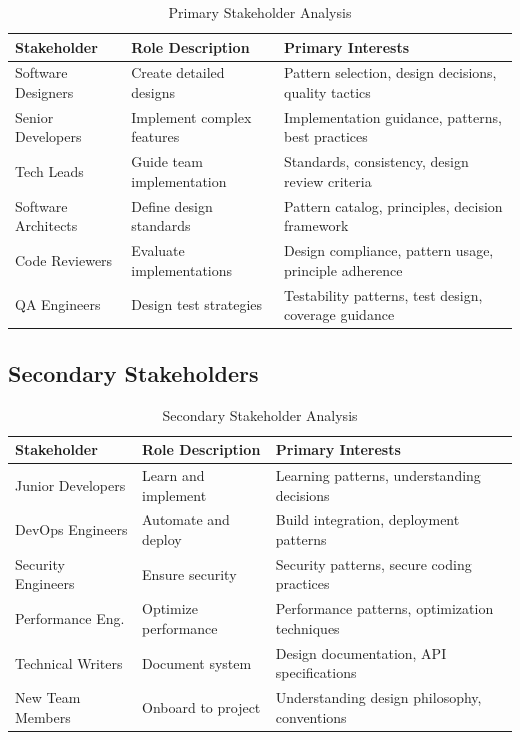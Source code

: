 \documentclass[11pt,letterpaper]{article}
\begin{document}
\begin{table}[H]
\centering
\caption{Primary Stakeholder Analysis}
\small
\begin{tabular}{@{}L{2.6cm}L{3.6cm}L{7cm}@{}}
\toprule
\textbf{Stakeholder} & \textbf{Role Description} & \textbf{Primary Interests} \\
\midrule
Software Designers & Create detailed designs & Pattern selection, design decisions, quality tactics \\
\addlinespace
Senior Developers & Implement complex features & Implementation guidance, patterns, best practices \\
\addlinespace
Tech Leads & Guide team implementation & Standards, consistency, design review criteria \\
\addlinespace
Software Architects & Define design standards & Pattern catalog, principles, decision framework \\
\addlinespace
Code Reviewers & Evaluate implementations & Design compliance, pattern usage, principle adherence \\
\addlinespace
QA Engineers & Design test strategies & Testability patterns, test design, coverage guidance \\
\bottomrule
\end{tabular}
\end{table}

\subsection{Secondary Stakeholders}

\begin{table}[H]
\centering
\caption{Secondary Stakeholder Analysis}
\small
\begin{tabular}{@{}L{2.6cm}L{3.6cm}L{7cm}@{}}
\toprule
\textbf{Stakeholder} & \textbf{Role Description} & \textbf{Primary Interests} \\
\midrule
Junior Developers & Learn and implement & Learning patterns, understanding decisions \\
\addlinespace
DevOps Engineers & Automate and deploy & Build integration, deployment patterns \\
\addlinespace
Security Engineers & Ensure security & Security patterns, secure coding practices \\
\addlinespace
Performance Eng. & Optimize performance & Performance patterns, optimization techniques \\
\addlinespace
Technical Writers & Document system & Design documentation, API specifications \\
\addlinespace
New Team Members & Onboard to project & Understanding design philosophy, conventions \\
\bottomrule
\end{tabular}
\end{table}
\end{document}
